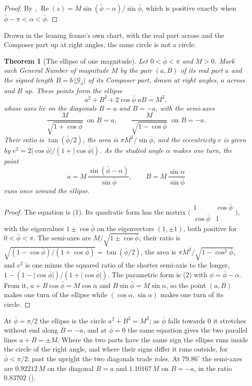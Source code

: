 \documentclass[11pt,a4paper]{amsart}
\theoremstyle{plain}
\newtheorem{theorem}{Theorem}[section]
\theoremstyle{definition}
\theoremstyle{remark}
\newcommand{\pb}{\bar{\phi}}                     %
\newcommand{\Gp}{\mathcal{G}_{\bar{\phi}}}       %
\renewcommand{\Re}{\operatorname{Re}}            %
\begin{document}
\begin{proof}
By , $\Re(z) = M\sin(\pb - \alpha)/\sin\pb$, which is positive exactly when $\pb - \pi < \alpha < \pb$.
\end{proof}

Drawn in the leaning frame's own chart, with the real part across and the Composer part up at right angles, the same circle is not a circle.

\begin{theorem}[The ellipse of one magnitude]\label{thm:ellipse}
Let $0 < \pb < \pi$ and $M > 0$. Mark each General Number of magnitude $M$ by the pair $(a, B)$ of its real part $a$ and the signed length $B = b\,\lvert\Gp\rvert$ of its Composer part, drawn at right angles, $a$ across and $B$ up. These points form the ellipse
\[
a^2 + B^2 + 2\cos\pb\;aB = M^2 ,
\]
whose axes lie on the diagonals $B = a$ and $B = -a$, with the semi-axes
\[
\frac{M}{\sqrt{1 + \cos\pb}} \ \text{ on } B = a , \qquad \frac{M}{\sqrt{1 - \cos\pb}} \ \text{ on } B = -a .
\]
Their ratio is $\tan(\pb/2)$, the area is $\pi M^2/\sin\pb$, and the eccentricity $e$ is given by $e^2 = 2\lvert\cos\pb\rvert/(1 + \lvert\cos\pb\rvert)$. As the studied angle $\alpha$ makes one turn, the point
\[
a = M\,\frac{\sin(\pb - \alpha)}{\sin\pb} , \qquad B = M\,\frac{\sin\alpha}{\sin\pb}
\]
runs once around the ellipse.
\end{theorem}

\begin{proof}
The equation is (1). Its quadratic form has the matrix $\bigl(\begin{smallmatrix} 1 & \cos\pb \\ \cos\pb & 1 \end{smallmatrix}\bigr)$, with the eigenvalues $1 \pm \cos\pb$ on the eigenvectors $(1, \pm 1)$, both positive for $0 < \pb < \pi$. The semi-axes are $M/\sqrt{1 \pm \cos\pb}$; their ratio is $\sqrt{(1 - \cos\pb)/(1 + \cos\pb)} = \tan(\pb/2)$, the area is $\pi M^2/\sqrt{1 - \cos^2\pb}$, and $e^2$ is one minus the squared ratio of the shorter semi-axis to the longer, $1 - (1 - \lvert\cos\pb\rvert)/(1 + \lvert\cos\pb\rvert)$. The parametric form is (2) with $\phi = \pb - \alpha$. From it, $a + B\cos\pb = M\cos\alpha$ and $B\sin\pb = M\sin\alpha$, so the point $(a, B)$ makes one turn of the ellipse while $(\cos\alpha, \sin\alpha)$ makes one turn of its circle.
\end{proof}

At $\pb = \pi/2$ the ellipse is the circle $a^2 + B^2 = M^2$; as $\pb$ falls towards $0$ it stretches without end along $B = -a$, and at $\pb = 0$ the same equation gives the two parallel lines $a + B = \pm M$. Where the two parts have the same sign the ellipse runs inside the circle of the right angle, and where their signs differ it runs outside, for $\pb < \pi/2$; past the upright the two diagonals trade roles. At $79.86^\circ$ the semi-axes are $0.92212\,M$ on the diagonal $B = a$ and $1.10167\,M$ on $B = -a$, in the ratio $0.83702$ ().
\end{document}
